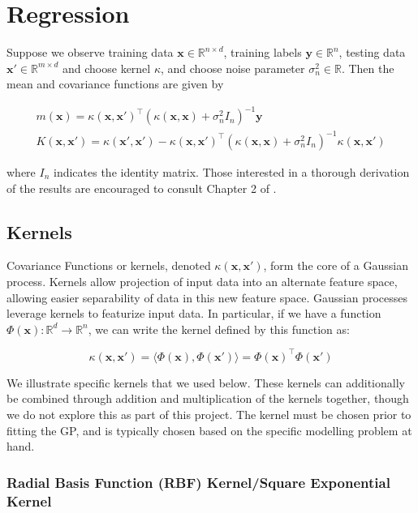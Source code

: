 \documentclass{article}
\newcommand{\R}{\mathbb{R}}
\newcommand{\bx}{\boldsymbol{x}}
\newcommand{\by}{\boldsymbol{y}}
\begin{document}
\section{Regression} \label{section:regression}

Suppose we observe training data $\bx \in \R^{n \times d}$, training labels $\by \in \R^{n}$, testing data $\bx' \in
\R^{m \times d}$ and choose kernel $\kappa$, and choose noise parameter $\sigma_{n}^{2} \in \R$. Then the mean and
covariance functions are given by 

\begin{gather*}
  m(\bx) = \kappa(\bx, \bx')^\top (\kappa(\bx, \bx) + \sigma_{n}^{2}I_{n})^{-1} \by \\
  K(\bx, \bx') = \kappa(\bx', \bx') - \kappa(\bx, \bx')^{\top} (\kappa(\bx, \bx) + \sigma_{n}^{2} I_{n})^{-1}
  \kappa(\bx, \bx')
\end{gather*}

where $I_{n}$ indicates the identity matrix. Those interested in a thorough derivation of the results are encouraged to
consult Chapter 2 of \cite{rasmussen_gaussian_2006}.

\subsection{Kernels} \label{subsection:kernels}

Covariance Functions or kernels, denoted $\kappa(\bx, \bx')$, form the core of a Gaussian process. Kernels allow
projection of input data into an alternate feature space, allowing easier separability of data in this new feature
space. Gaussian processes leverage kernels to featurize input data. In particular, if we have a function
$\Phi(\bx): \R^d \rightarrow \R^n$, we can write the kernel defined by this function as:

\[
  \kappa(\bx, \bx') = \langle \Phi(\bx), \Phi(\bx') \rangle = \Phi(\bx)^\top \Phi(\bx')
\]

We illustrate specific kernels that we used below. These kernels can additionally be combined through addition and
multiplication of the kernels together, though we do not explore this as part of this project. The kernel must be chosen
prior to fitting the GP, and is typically chosen based on the specific modelling problem at hand.

\subsubsection{Radial Basis Function (RBF) Kernel/Square Exponential Kernel}
\end{document}
